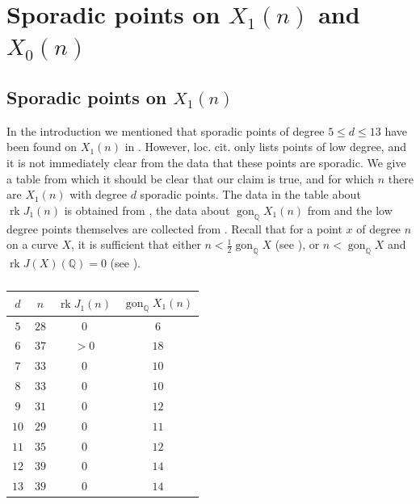 \documentclass[11pt,reqno]{amsart}
\DeclareMathOperator{\rk}{rk}
\DeclareMathOperator{\gon}{gon}
\theoremstyle{definition}
\numberwithin{equation}{section}
\newcommand{\Q}{\mathbb{Q}}
\begin{document}

\section{Sporadic points on \texorpdfstring{$X_1(n)$}{X1(n)} and \texorpdfstring{$X_0(n)$}{X0(n)}}
\subsection{Sporadic points on \texorpdfstring{$X_1(n)$}{X1(n)}}
\label{sec:sporadic}
In the introduction we mentioned that sporadic points of degree $5\leq d\leq 13$ have been found on $X_1(n)$ in \cite{vanHoeij}. However, loc. cit. only lists points of low degree, and it is not immediately clear from the data that these points are sporadic. We give a table from which it should be clear that our claim is true, and for which $n$ there are $X_1(n)$ with degree $d$ sporadic points. The data in the table about $\rk J_1(n)$ is obtained from \cite[Theorem 3.1]{Deg3Class}, the data about $\gon_\Q X_1(n)$ from \cite{derickxVH} and the low degree points themselves are collected from \cite{vanHoeij}. Recall that for a point $x$ of degree $n$ on a curve $X$, it is sufficient that either $n<\frac 1 2\gon_\Q X$ (see \cite{frey}), or $n<\gon_\Q X$ and $\rk J(X)(\Q)=0$ (see \cite[Proposition 2.3]{DerickxSutherland}).


\begin{table}[H]
\centering
\begin{tabular}{c|c|c|c}
$d$ & $n$ & $\rk J_1(n)$ & $\gon_\Q X_1(n)$  \\ 
\hline
$5$  & $28$   & $0$ & $6$    \\
$6$  & $37$   & $>0$  & $18$   \\
$7$  & $33$  & $0$  & $10$  \\
$8$ & $33$  & $0$ & $10$  \\
$9$ & $31$  & $0$ & $12$ \\
$10$ & $29$  & $0$  & $11$  \\
$11$ & $35$ & $0$ & $12$  \\
$12$ & $39$  & $0$  & $14$  \\
$13$ & $39$ & $0$  & $14$  \\

\end{tabular}
\caption{}\label{table:sporadic}
\end{table}
\end{document}
